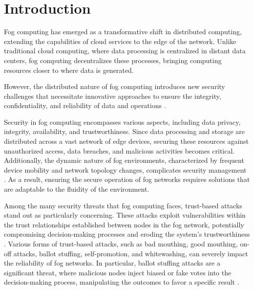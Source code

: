 \documentclass{sn-jnl}%
\begin{document}
\section{Introduction}
Fog computing has emerged as a transformative shift in distributed computing, extending the capabilities of cloud services to the edge of the network. Unlike traditional cloud computing, where data processing is centralized in distant data centers, fog computing decentralizes these processes, bringing computing resources closer to where data is generated. 


However, the distributed nature of fog computing introduces new security challenges that necessitate innovative approaches to ensure the integrity, confidentiality, and reliability of data and operations \cite{yi2015survey}.

Security in fog computing encompasses various aspects, including data privacy, integrity, availability, and trustworthiness. Since data processing and storage are distributed across a vast network of edge devices, securing these resources against unauthorized access, data breaches, and malicious activities becomes critical. Additionally, the dynamic nature of fog environments, characterized by frequent device mobility and network topology changes, complicates security management \cite{mao2017survey}. As a result, ensuring the secure operation of fog networks requires solutions that are adaptable to the fluidity of the environment.

Among the many security threats that fog computing faces, trust-based attacks stand out as particularly concerning. These attacks exploit vulnerabilities within the trust relationships established between nodes in the fog network, potentially compromising decision-making processes and eroding the system's trustworthiness \cite{junejo2019trustee}. Various forms of trust-based attacks, such as bad mouthing, good mouthing, on-off attacks, ballot stuffing, self-promotion, and whitewashing, can severely impact the reliability of fog networks. In particular, ballot stuffing attacks are a significant threat, where malicious nodes inject biased or fake votes into the decision-making process, manipulating the outcomes to favor a specific result \cite{nair2023ai}.
\end{document}
